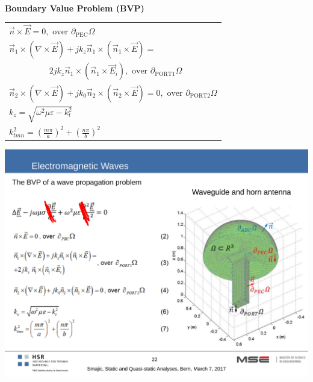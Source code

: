 \textbf{\\ Boundary Value Problem (BVP)\\}
\begin{minipage}[lt]{11cm}
	\begin{tabular}{l}
		\(\displaystyle \vec{n} \times \vec{E} = 0, \textrm{ over }\partial_{\mathrm{PEC}}\Omega \) \\
		\(\displaystyle \vec{n}_1 \times \left(\nabla \times \vec{E}\right) + jk_z\vec{n}_1 \times \left(\vec{n}_1 \times \vec{E}\right) = \) \\
		\(\displaystyle \hspace{2cm}2jk_z \vec{n}_1 \times \left(\vec{n}_1 \times \vec{E}_i\right), \textrm{ over } \partial_{\mathrm{PORT1}}\Omega \) \\
		\(\displaystyle \vec{n}_2 \times \left(\nabla \times \vec{E}\right) + jk_0\vec{n}_2 \times \left(\vec{n}_2 \times \vec{E}\right) = 0, \textrm{ over } \partial_{\textrm{PORT2}}\Omega \) \\
		\(\displaystyle k_z = \sqrt{\omega^2\mu\varepsilon-k_t^2} \) \\
		\(\displaystyle k^2_{tmn} = \left(\frac{m\pi}{a}\right)^2 + \left(\frac{n\pi}{b}\right) ^2\) \\
	\end{tabular}
\end{minipage}
\begin{minipage}[rt]{8cm}
	\includegraphics[width=.8\textwidth]{./images/BVP_wave.pdf}
\end{minipage}